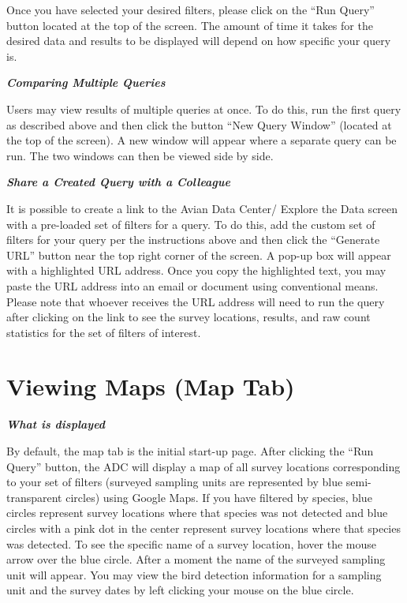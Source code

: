 \documentclass[
  letterpaper,
  DIV=11,
  numbers=noendperiod,
  oneside]{scrreprt}
\begin{document}
Once you have selected your desired filters, please click on the ``Run
Query'' button located at the top of the screen. The amount of time it
takes for the desired data and results to be displayed will depend on
how specific your query is.

\textbf{\emph{Comparing Multiple Queries}}

Users may view results of multiple queries at once. To do this, run the
first query as described above and then click the button ``New Query
Window'' (located at the top of the screen). A new window will appear
where a separate query can be run. The two windows can then be viewed
side by side.

\textbf{\emph{Share a Created Query with a Colleague}}

It is possible to create a link to the Avian Data Center/ Explore the
Data screen with a pre-loaded set of filters for a query. To do this,
add the custom set of filters for your query per the instructions above
and then click the ``Generate URL'' button near the top right corner of
the screen. A pop-up box will appear with a highlighted URL address.
Once you copy the highlighted text, you may paste the URL address into
an email or document using conventional means. Please note that whoever
receives the URL address will need to run the query after clicking on
the link to see the survey locations, results, and raw count statistics
for the set of filters of interest.

\hypertarget{viewing-maps-map-tab}{%
\section*{Viewing Maps (Map Tab)}\label{viewing-maps-map-tab}}


\textbf{\emph{What is displayed}}

By default, the map tab is the initial start-up page. After clicking the
``Run Query'' button, the ADC will display a map of all survey locations
corresponding to your set of filters (surveyed sampling units are
represented by blue semi-transparent circles) using Google Maps. If you
have filtered by species, blue circles represent survey locations where
that species was not detected and blue circles with a pink dot in the
center represent survey locations where that species was detected. To
see the specific name of a survey location, hover the mouse arrow over
the blue circle. After a moment the name of the surveyed sampling unit
will appear. You may view the bird detection information for a sampling
unit and the survey dates by left clicking your mouse on the blue
circle.
\end{document}
